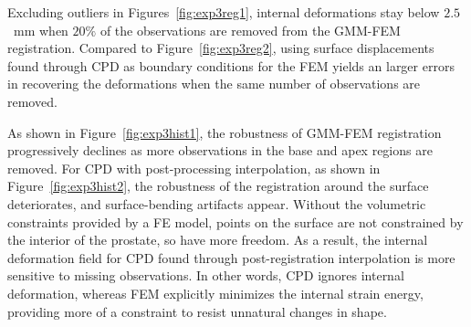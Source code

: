 \documentclass[journal]{IEEEtran}
\begin{document}
Excluding outliers in Figures~\ref{fig:exp3reg1}, internal deformations stay below $2.5$~mm when $20\%$ of the observations are removed from the GMM-FEM registration. Compared to Figure~\ref{fig:exp3reg2}, using surface displacements found through CPD as boundary conditions for the FEM yields an larger errors in recovering the deformations when the same number of observations are removed.

As shown in Figure~\ref{fig:exp3hist1}, the robustness of GMM-FEM registration progressively declines as more observations in the base and apex regions are removed. For CPD with post-processing interpolation, as shown in Figure~\ref{fig:exp3hist2}, the robustness of the registration around the surface deteriorates, and surface-bending artifacts appear. Without the volumetric constraints provided by a FE model, points on the surface are not constrained by the interior of the prostate, so have more freedom. As a result, the internal deformation field for CPD found through post-registration interpolation is more sensitive to missing observations. In other words, CPD ignores internal deformation, whereas FEM explicitly minimizes the internal strain energy, providing more of a constraint to resist unnatural changes in shape.
\end{document}
